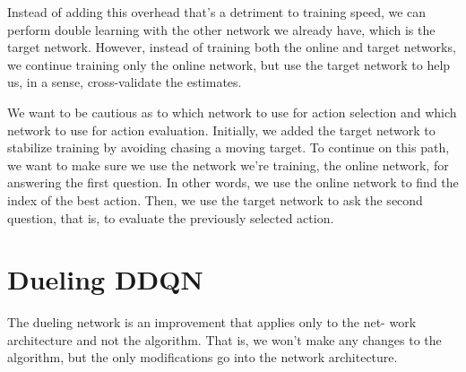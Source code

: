 Instead of adding this overhead that’s a detriment to training speed, we can perform double learning with the other network we already have, which is the target network. However, instead of training both the online and target networks, we continue training only the online network, but use the target network to help us, in a sense, cross-validate the estimates.

We want to be cautious as to which network to use for action selection and which network to use for action evaluation. Initially, we added the target network to stabilize training by avoiding chasing a moving target. To continue on this path, we want to make sure we use the network we’re training, the online network, for answering the first question. In other words, we use the online network to find the index of the best action. Then, we use the target network to ask the second question, that is, to evaluate the previously selected action.


\section{Dueling DDQN}
The dueling network is an improvement that applies only to the net- work architecture and not the algorithm. That is, we won’t make any changes to the algorithm, but the only modifications go into the network architecture. 
